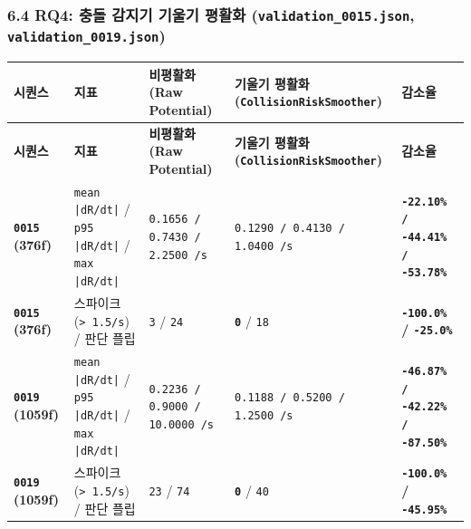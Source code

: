 \documentclass[10.5pt,a4paper]{article}
\begin{document}
\subsubsection{6.4 RQ4: 충돌 감지기 기울기 평활화 (\texttt{validation\_\allowbreak{}0015.\allowbreak{}json}, \texttt{validation\_\allowbreak{}0019.\allowbreak{}json})}

\begin{footnotesize}
\setlength{\tabcolsep}{4pt}
\setlength{\LTleft}{0pt}\setlength{\LTright}{0pt}
\begin{longtable}{>{\raggedright\arraybackslash}p{} >{\raggedright\arraybackslash}p{} >{\raggedright\arraybackslash}p{} >{\raggedright\arraybackslash}p{} >{\raggedright\arraybackslash}p{}}
\toprule
\textbf{시퀀스} & \textbf{지표} & \textbf{비평활화 (Raw Potential)} & \textbf{기울기 평활화 (\texttt{CollisionRiskSmoother})} & \textbf{감소율} \\
\midrule
\endfirsthead
\toprule
\textbf{시퀀스} & \textbf{지표} & \textbf{비평활화 (Raw Potential)} & \textbf{기울기 평활화 (\texttt{CollisionRiskSmoother})} & \textbf{감소율} \\
\midrule
\endhead
\bottomrule
\endfoot
\textbf{\texttt{0015} (376f)} & \texttt{mean |dR/\allowbreak{}dt|} / \texttt{p95 |dR/\allowbreak{}dt|} / \texttt{max |dR/\allowbreak{}dt|} & \texttt{0.\allowbreak{}1656 /\allowbreak{} 0.\allowbreak{}7430 /\allowbreak{} 2.\allowbreak{}2500 /\allowbreak{}s} & \texttt{0.\allowbreak{}1290 /\allowbreak{} 0.\allowbreak{}4130 /\allowbreak{} 1.\allowbreak{}0400 /\allowbreak{}s} & \textbf{\texttt{-\allowbreak{}22.\allowbreak{}10\% /\allowbreak{} -\allowbreak{}44.\allowbreak{}41\% /\allowbreak{} -\allowbreak{}53.\allowbreak{}78\%}} \\
\textbf{\texttt{0015} (376f)} & 스파이크 (\texttt{> 1.\allowbreak{}5/\allowbreak{}s}) / 판단 플립 & \texttt{3} / \texttt{24} & \textbf{\texttt{0}} / \texttt{18} & \textbf{\texttt{-\allowbreak{}100.\allowbreak{}0\%} / \texttt{-\allowbreak{}25.\allowbreak{}0\%}} \\
\textbf{\texttt{0019} (1059f)} & \texttt{mean |dR/\allowbreak{}dt|} / \texttt{p95 |dR/\allowbreak{}dt|} / \texttt{max |dR/\allowbreak{}dt|} & \texttt{0.\allowbreak{}2236 /\allowbreak{} 0.\allowbreak{}9000 /\allowbreak{} 10.\allowbreak{}0000 /\allowbreak{}s} & \texttt{0.\allowbreak{}1188 /\allowbreak{} 0.\allowbreak{}5200 /\allowbreak{} 1.\allowbreak{}2500 /\allowbreak{}s} & \textbf{\texttt{-\allowbreak{}46.\allowbreak{}87\% /\allowbreak{} -\allowbreak{}42.\allowbreak{}22\% /\allowbreak{} -\allowbreak{}87.\allowbreak{}50\%}} \\
\textbf{\texttt{0019} (1059f)} & 스파이크 (\texttt{> 1.\allowbreak{}5/\allowbreak{}s}) / 판단 플립 & \texttt{23} / \texttt{74} & \textbf{\texttt{0}} / \texttt{40} & \textbf{\texttt{-\allowbreak{}100.\allowbreak{}0\%} / \texttt{-\allowbreak{}45.\allowbreak{}95\%}} \\
\end{longtable}
\end{footnotesize}
\end{document}
